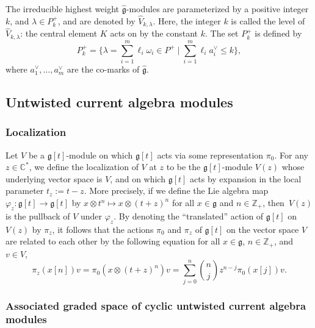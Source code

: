 \documentclass[pdftex]{sigma}
\numberwithin{equation}{section}
\begin{document}
The irreducible highest weight $\widehat{\mathfrak{g}}$-modules are parameterized by a positive integer $k$, and $\lambda\in P_k^+$, and are denoted by $\widehat{V}_{k,\lambda}$. Here, the integer $k$ is called the level of $\widehat{V}_{k,\lambda}$: the central element $K$ acts on  by the constant $k$. The set $P_k^+$ is defined by
\begin{equation*}
P_k^+=\Bigg\{\lambda=\sum_{i=1}^m\ell_i\omega_i\in P^+\mid \sum_{i=1}^m\ell_ia_i^{\vee}\leq k\Bigg\},
\end{equation*}
where $a_1^{\vee},\dots,a_m^{\vee}$ are the co-marks of $\widehat{\mathfrak{g}}$.

\subsection{Untwisted current algebra modules}\label{Section 2.2}

\subsubsection{Localization}\label{Section 2.2.1}

Let $V$ be a $\mathfrak{g}[t]$-module on which $\mathfrak{g}[t]$ acts via some representation $\pi_0$. For any $z\in\mathbb{C}^*$, we define the localization of $V$ at $z$ to be the $\mathfrak{g}[t]$-module $V(z)$ whose underlying vector space is $V$, and on which $\mathfrak{g}[t]$ acts by expansion in the local parameter $t_z:=t-z$. More precisely, if we define the Lie algebra map $\varphi_z\colon\mathfrak{g}[t]\to\mathfrak{g}[t]$ by $x\otimes t^n\mapsto x\otimes(t+z)^n$ for all $x\in\mathfrak{g}$ and $n\in\mathbb{Z}_+$, then~$V(z)$ is the pullback of $V$ under $\varphi_z$. By denoting the ``translated'' action of $\mathfrak{g}[t]$ on $V(z)$ by $\pi_z$, it follows that the actions $\pi_0$ and $\pi_z$ of $\mathfrak{g}[t]$ on the vector space $V$ are related to each other by the following equation for all $x\in\mathfrak{g}$, $n\in\mathbb{Z}_+$, and $v\in V$,
\begin{equation}\label{eq:2.1}
\pi_z(x[n])v=\pi_0(x\otimes (t+z)^n)v=\sum_{j=0}^n\binom{n}{j}z^{n-j}\pi_0(x[j])v.
\end{equation}

\subsubsection{Associated graded space of cyclic untwisted current algebra modules}\label{Section 2.2.2}
\end{document}

